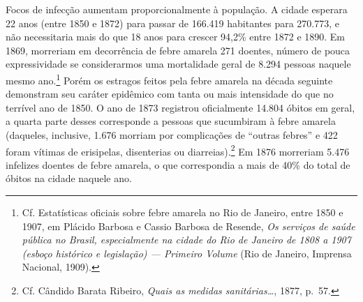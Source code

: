 Focos de infecção aumentam proporcionalmente à população. A cidade
esperara 22 anos (entre 1850 e 1872) para passar de 166.419 habitantes
para 270.773, e não necessitaria mais do que 18 anos para crescer 94,2\%
entre 1872 e 1890. Em 1869, morreriam em decorrência de febre amarela
271 doentes, número de pouca expressividade se considerarmos uma
mortalidade geral de 8.294 pessoas naquele mesmo ano.\footnote{Cf.
  Estatísticas oficiais sobre febre amarela no Rio de Janeiro, entre
  1850 e 1907, em Plácido Barbosa e Cassio Barbosa de Resende, \textit{Os
  serviços de saúde pública no Brasil, especialmente na cidade do Rio de
  Janeiro de 1808 a 1907 (esboço histórico e legislação) --- Primeiro
  Volume} (Rio de Janeiro, Imprensa Nacional, 1909).} Porém os estragos
feitos pela febre amarela na década seguinte demonstram seu caráter
epidêmico com tanta ou mais intensidade do que no terrível ano de 1850.
O ano de 1873 registrou oficialmente 14.804 óbitos em geral, a quarta
parte desses corresponde a pessoas que sucumbiram à febre amarela
(daqueles, inclusive, 1.676 morriam por complicações de ``outras
febres'' e 422 foram vítimas de erisipelas, disenterias ou
diarreias).\footnote{Cf. Cândido Barata Ribeiro, \textit{Quais as medidas
  sanitárias\ldots{}}, 1877, p.~57.} Em 1876 morreriam 5.476 infelizes
doentes de febre amarela, o que correspondia a mais de 40\% do total de
óbitos na cidade naquele ano.

